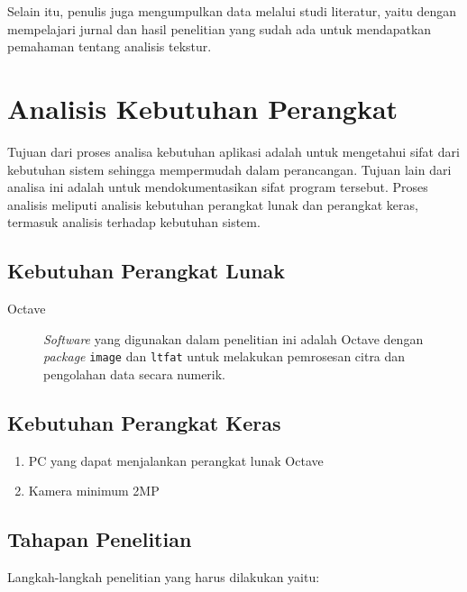 \documentclass[laporan.tex]{subfiles}
\begin{document}
Selain itu, penulis juga mengumpulkan data melalui studi literatur, yaitu dengan mempelajari jurnal dan hasil penelitian yang sudah ada untuk mendapatkan pemahaman tentang analisis tekstur.

\section{Analisis Kebutuhan Perangkat}

Tujuan  dari  proses analisa kebutuhan aplikasi adalah untuk mengetahui sifat dari  kebutuhan  sistem  sehingga  mempermudah  dalam perancangan. Tujuan lain dari analisa ini adalah untuk mendokumentasikan sifat  program  tersebut. Proses analisis meliputi analisis kebutuhan perangkat lunak dan perangkat keras, termasuk analisis terhadap kebutuhan sistem.

\subsection{Kebutuhan Perangkat Lunak}

\begin{description}

\item [Octave] 
\emph{Software} yang digunakan dalam penelitian ini adalah Octave dengan \emph{package} \texttt{image} dan \texttt{ltfat} untuk melakukan pemrosesan citra dan pengolahan data secara numerik.

\end{description}

\subsection{Kebutuhan Perangkat Keras}

\begin{enumerate}

\item PC yang dapat menjalankan perangkat lunak Octave
\item Kamera minimum 2MP

\end{enumerate}

\subsection{Tahapan Penelitian}

Langkah-langkah penelitian yang harus dilakukan yaitu:
\end{document}
